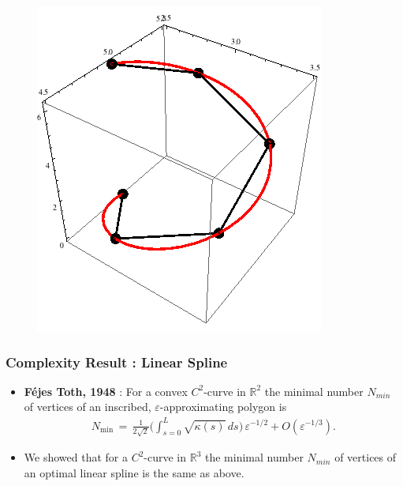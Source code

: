 \documentclass[ucs,9pt,pagenumbersfull]{beamer}
\begin{document}
\begin{frame}
\begin{figure}
      \subfigure{\label{fig:linear_spline}}\includegraphics[scale=0.25]{Figures/linear_spline.png}
    \end{figure}
\end{frame}

\begin{frame}
  \frametitle{Complexity Result : Linear Spline}
  \begin{itemize}
  \item \textbf{Féjes Toth, 1948} : For a convex \(C^2\)-curve in
    \(\mathbb{R}^2\)  the minimal number \(N_{min}\) of vertices of
    an inscribed, \(\varepsilon\)-approximating polygon is
    \begin{align*}
      N_{\min}\,=\,\frac{1}{2\sqrt{2}}\bigl(\int_{s=0}^L
      \sqrt{\kappa(s)}\,ds\bigr)\,\varepsilon^{-1/2} + O(\varepsilon^{-1/3}).
    \end{align*}
  \item We showed that for a \(C^2\)-curve in \(\mathbb{R}^3\) the minimal
    number \(N_{min}\) of vertices of an optimal linear spline
    is the same as above.
  \end{itemize}
\end{frame}
\end{document}
